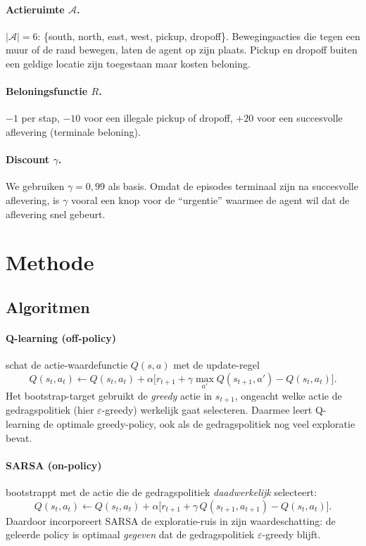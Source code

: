 \documentclass[11pt,a4paper]{article}
\begin{document}
\paragraph{Actieruimte $\mathcal{A}$.}
$|\mathcal{A}| = 6$: \{south, north, east, west, pickup, dropoff\}.
Bewegingsacties die tegen een muur of de rand bewegen, laten de agent
op zijn plaats. Pickup en dropoff buiten een geldige locatie zijn
toegestaan maar kosten beloning.

\paragraph{Belonings\-functie $R$.}
$-1$ per stap, $-10$ voor een illegale pickup of dropoff,
$+20$ voor een succesvolle aflevering (terminale beloning).

\paragraph{Discount $\gamma$.}
We gebruiken $\gamma = 0{,}99$ als basis. Omdat de episodes terminaal
zijn na succesvolle aflevering, is $\gamma$ vooral een knop voor de
``urgentie'' waarmee de agent wil dat de aflevering snel gebeurt.

\section{Methode}
\label{sec:method}

\subsection{Algoritmen}

\paragraph{Q-learning (off-policy)} \cite{watkins_dayan_1992}
schat de actie-waardefunctie $Q(s,a)$ met de update-regel
\begin{equation}
  Q(s_t, a_t) \leftarrow Q(s_t, a_t) + \alpha
    \bigl[ r_{t+1} + \gamma \max_{a'} Q(s_{t+1}, a') - Q(s_t, a_t) \bigr].
  \label{eq:qlearning}
\end{equation}
Het bootstrap-target gebruikt de \emph{greedy} actie in $s_{t+1}$,
ongeacht welke actie de gedragspolitiek (hier $\varepsilon$-greedy)
werkelijk gaat selecteren. Daarmee leert Q-learning de optimale
greedy-policy, ook als de gedragspolitiek nog veel exploratie bevat.

\paragraph{SARSA (on-policy)} \cite{rummery_niranjan_1994}
bootstrappt met de actie die de gedragspolitiek \emph{daadwerkelijk}
selecteert:
\begin{equation}
  Q(s_t, a_t) \leftarrow Q(s_t, a_t) + \alpha
    \bigl[ r_{t+1} + \gamma\, Q(s_{t+1}, a_{t+1}) - Q(s_t, a_t) \bigr].
  \label{eq:sarsa}
\end{equation}
Daardoor incorporeert SARSA de exploratie-ruis in zijn waardeschatting:
de geleerde policy is optimaal \emph{gegeven} dat de gedragspolitiek
$\varepsilon$-greedy blijft.
\end{document}
